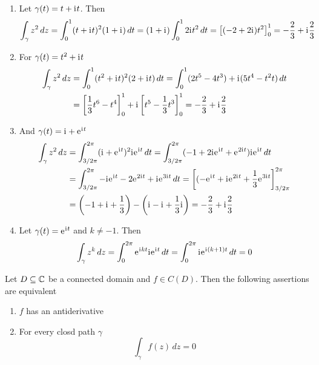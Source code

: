 \begin{definition}
\begin{examples}\hfill
    \begin{enumerate}
        \item Let \( \gamma(t) = t + \iu t \). Then
			\[
				\int_{\gamma} z^2\,dz
					= \int_0^1 (t + \iu t)^2(1 + \iu)\,dt
					= (1 + \iu)\int_0^1 2\iu t^2\,dt 
					= \left[ (-2 + 2\iu) t^2 \right]_0^1 
					= -\frac{2}{3} + \iu \frac{2}{3}
			\]
		\item For \( \gamma(t) = t^2 + \iu t \) 
			\[
				\begin{split}
					\int_\gamma z^2\,dz
						& = \int_0^1 (t^2 + \iu t)^2(2 + \iu t)\,dt
							= \int_0^1 (2t^5 -  4t^3) + \iu(5t^4 - t^2t)\,dt \\
						& = \left[ \frac{1}{3} t^6 - t^4 \right]_0^1 + 
								\iu\left[ t^5 - \frac{1}{3}t^3 \right]_0^1
						  = -\frac{2}{3} + \iu \frac{2}{3}
				\end{split}
			\]
		\item And \( \gamma(t) = \iu + \eu^{\iu t} \)
			\[
				\begin{split}
					\int_\gamma z^2\,dz
						& = \int_{3/2\pi}^{2\pi} (\iu + \eu^{\iu t})^2\iu\eu^{\iu t}\,dt
							= \int_{3/2\pi}^{2\pi} (-1 + 2\iu\eu^{\iu t} + \eu^{2\iu t})\iu\eu^{\iu t}\,dt \\
						& = \int_{3/2\pi}^{2\pi} -\iu\eu^{\iu t} - 2\eu^{2\iu t} + \iu\eu^{3\iu t}\,dt
							= \left[(-\eu^{\iu t} + \iu\eu^{2\iu t} + \frac{1}{3}\eu^{3\iu t}\right]_{3/2\pi}^{2\pi} \\
						& = \left( -1 + \iu + \frac{1}{3} \right) - \left( \iu - \iu + \frac{1}{3}\iu \right)
							= -\frac{2}{3} + \iu \frac{2}{3}
				\end{split}
			\]
		\item Let \( \gamma(t) = \eu^{\iu t} \) and \( k \ne -1 \). Then
			\[
				\int_\gamma z^k\,dz = 
					\int_0^{2\pi} \eu^{\iu kt}\iu\eu^{\iu t}\,dt = 
					\int_0^{2\pi} \iu\eu^{\iu (k + 1) t}\,dt = 0
			\]
    \end{enumerate}
\end{examples}
\bigskip


\begin{theorem}\label{thm:thm_antiderivative}
Let \( D \subseteq \C \) be a connected domain and \( f \in C(D)\). Then the following assertions are equivalent
\begin{enumerate}
	\item \( f \) has an antiderivative
	\item For every closd path \( \gamma \)
		\[
			\int_{\gamma} f(z)\,dz = 0
		\]
\end{enumerate}
\end{theorem}


\end{definition}
